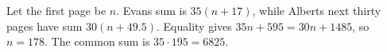 Let the first page be $n$. Evan\textquotesingle s sum is $35(n+17)$, while Albert\textquotesingle s next thirty pages have sum $30(n+49.5)$. Equality gives $35n+595=30n+1485$, so $n=178$. The common sum is $35\cdot195=\boxed{6825}$.
